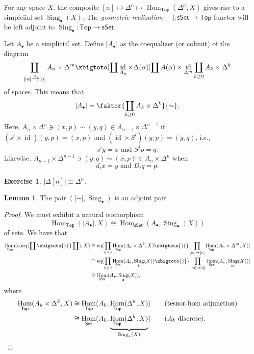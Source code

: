 \documentclass[10pt,letterpaper,cm]{nupset}
\theoremstyle{definition}
\theoremstyle{theorem}
\newtheorem{lemma}[defn]{Lemma}
\newtheorem{exercise}[defn]{Exercise}
\theoremstyle{remark}
\newcommand{\1}{\mathbb{1}}
\newcommand{\0}{\vec 0}
\DeclareMathOperator{\id}{id}
\DeclareMathOperator{\Hom}{Hom}
\DeclareMathOperator{\eq}{eq}
\DeclareMathOperator{\coeq}{coeq}
\DeclareMathOperator{\sing}{Sing}
\begin{document}
 For any space $X$, the composite $\left[n\right] \mapsto \Delta^n \mapsto \Hom_{\mathsf{Top}}(\Delta^n, X)$ gives rise to a simplciial set $\sing_{\bullet}(X)$. The \textit{geometric realization} $\left\lvert{-}\right\rvert : \mathsf{sSet} \to \mathsf{Top}$ functor will be left adjoint to $\sing_{\bullet} : \mathsf{Top} \to \mathsf{sSet}$. 
 
 \medskip
 
 Let $A_{\bullet}$ be a simplicial set. Define $\left\lvert{A_{\bullet}}\right\rvert$ as the coequalizer (or colimit) of the diagram
 \[
 \coprod_{\left[m\right] \xrightarrow{\alpha} \left[n\right]}A_n \times \Delta^m 
  \xbigtoto[\coprod \id_{A_n} \times \Delta(\alpha)]{\coprod A(\alpha) \times \id_{\Delta^m}}
  \coprod_{k \geq 0} A_k \times \Delta^k
 \] of spaces. This means that 
\[
\left\lvert{A_{\bullet}}\right\rvert = \faktor{\coprod_{k \geq 0} A_k \times \Delta^k}{\sim}
.\]
Here, $A_n \times \Delta^n \ni \left(x,p\right) \sim \left(y,q\right) \in A_{n-1} \times \Delta^{n-1}$ if $\left(s^i \times \id\right)(y,p) = \left(x,p\right)$ and $\left(\id \times S^i\right)(y,p) = \left(y,q\right)$, i.e., 
\[
\text{$s^i{y} = x$ and $S^i{p} = q$}
.\] Likewise, 
$A_{n-1} \times \Delta^{n-1} \ni \left(y,q\right) \sim \left(x,p\right) \in A_{n} \times \Delta^{n}$ when 
\[
\text{$d_i{x} = y$ and $D_i{q} = p$}.
\]

\begin{exercise}
$\left\lvert{\Delta\left[n\right]}\right\rvert \cong \Delta^n$.
\end{exercise}

\begin{lemma}
The pair $\left(\left\lvert{-}\right\rvert, \sing_{\bullet}\right)$ is an adjoint pair.
\end{lemma}
\begin{proof}
We must exhibit a natural isomorphism
\[
\Hom_{\mathsf{Top}}(\left\lvert{A_{\bullet}}\right\rvert, X) \cong \Hom_{\mathsf{sSet}}(A_{\bullet}, \sing_{\bullet}(X))
\] of sets. We have that 
\begin{align*}
\Hom_{\mathsf{Top}}(\coeq(\coprod  \xbigtoto{}{} \coprod), X) & \cong \eq(\prod_{k \geq 0} \Hom_{\mathsf{Top}}(A_k \times \Delta^k, X)  \xbigtoto{}{} \prod_{\left[m\right] \to \left[n\right]}\Hom_{\mathsf{Top}}(A_n \times \Delta^m, X))
\\ & \cong \eq(\prod_{k \geq 0} \Hom_{\mathsf{Set}}(A_k, \sing_k(X))  \xbigtoto{}{} \prod_{\left[m\right] \to \left[n\right]} \Hom_{\mathsf{Set}}(A_n, \sing_m(X)))
\\ & \cong \Hom_{\mathsf{sSet}}(A_{\bullet}, \sing_{\bullet}(X)),
\end{align*}
where 
\begin{align*}
\Hom_{\mathsf{Top}}(A_k \times \Delta^k, X) & \cong  \Hom_{\mathsf{Top}}(A_k, \Hom_{\mathsf{Top}}(\Delta^k, X)) \tag{\text{tesnor-hom adjunction}}
\\ & \cong \Hom_{\mathsf{Set}}(A_k, \underbrace{\Hom_{\mathsf{Top}}(\Delta^k, X)}_{\sing_k(X)}) \tag{$A_k$ discrete}.
\end{align*}
\end{proof}
\end{document}
